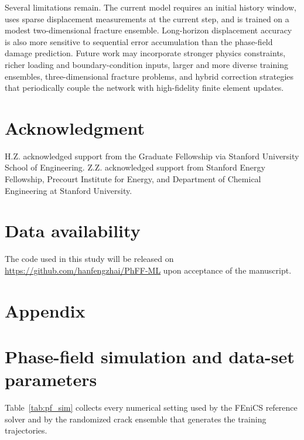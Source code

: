 \documentclass[10pt]{article}
\theoremstyle{definition}
\begin{document}
Several limitations remain.
%
The current model requires an initial history window, uses sparse displacement measurements at the current step, and is trained on a modest two-dimensional fracture ensemble.
%
Long-horizon displacement accuracy is also more sensitive to sequential error accumulation than the phase-field damage prediction.
%
Future work may incorporate stronger physics constraints, richer loading and boundary-condition inputs, larger and more diverse training ensembles, three-dimensional fracture problems, and hybrid correction strategies that periodically couple the network with high-fidelity finite element updates.


\section*{Acknowledgment}

H.Z. acknowledged support from the Graduate Fellowship via Stanford University School of Engineering.
%
Z.Z. acknowledged support from Stanford Energy Fellowship, Precourt Institute for Energy, and Department of Chemical Engineering at Stanford University.

\section*{Data availability}

The code used in this study will be released on \url{https://github.com/hanfengzhai/PhFF-ML} upon acceptance of the manuscript.

\section*{Appendix}
\appendix
{}

\section{Phase-field simulation and data-set parameters}\label{sec:app_pf_sim}

Table~\ref{tab:pf_sim} collects every numerical setting used by the FEniCS reference solver and by the randomized crack ensemble that generates the training trajectories.
\end{document}
